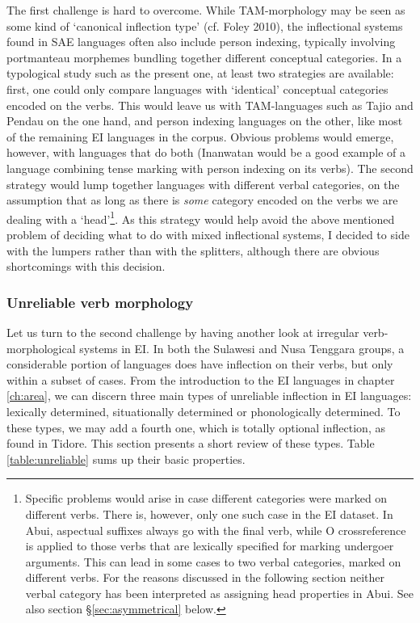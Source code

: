 The first challenge is hard to overcome. While TAM-morphology may be seen as some kind of `canonical inflection type' (cf. Foley 2010), the inflectional systems found in SAE languages often also include person indexing, typically involving portmanteau morphemes bundling together different conceptual categories. In a typological study such as the present one, at least two strategies are available: first, one could only compare languages with `identical' conceptual categories encoded on the verbs. This would leave us with TAM-languages such as Tajio and Pendau on the one hand, and person indexing languages on the other, like most of the remaining EI languages in the corpus. Obvious problems would emerge, however, with languages that do both (Inanwatan would be a good example of a language combining tense marking with person indexing on its verbs). The second strategy would lump together languages with different verbal categories, on the assumption that as long as there is \emph{some} category encoded on the verbs we are dealing with a `head'\footnote{Specific problems would arise in case different categories were marked on different verbs. There is, however, only one such case in the EI dataset. In Abui, aspectual suffixes always go with the final verb, while O crossreference is applied to those verbs that are lexically specified for marking undergoer arguments. This can lead in some cases to two verbal categories, marked on different verbs. For the reasons discussed in the following section neither verbal category has been interpreted as assigning head properties in Abui. See also section §\ref{sec:asymmetrical} below.}. As this strategy would help avoid the above mentioned problem of deciding what to do with mixed inflectional systems, I decided to side with the lumpers rather than with the splitters, although there are obvious shortcomings with this decision. 
 
\subsubsection{Unreliable verb morphology} \label{sec:unreliable}

Let us turn to the second challenge by having another look at irregular verb-morphological systems in EI. In both the Sulawesi and Nusa Tenggara groups, a considerable portion of languages does have inflection on their verbs, but only within a subset of cases. From the introduction to the EI languages in chapter \ref{ch:area}, we can discern three main types of unreliable inflection in EI languages: lexically determined, situationally determined or phonologically determined. To these types, we may add a fourth one, which is totally optional inflection, as found in Tidore. This section presents a short review of these types. Table \ref{table:unreliable} sums up their basic properties.

